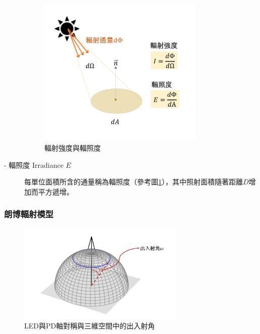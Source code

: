 \begin{description}
            \begin{figure}[htpb]
                \centering
                \includegraphics[width=8cm]{ch2pic/intensity_irradiance.png}
                \caption{輻射強度與輻照度}
                \label{pic:intensity_irradiance}
            \end{figure}

        \item[- 輻照度 Irradiance $E$] \hfill
            
            \qquad
            每單位面積所含的通量稱為輻照度（參考圖\ref{pic:intensity_irradiance}），其中照射面積隨著距離$D$增加而平方遞增。

            
            
    \end{description}


    



    
    \subsubsection{朗博輻射模型}
        \label{chp:lambertian}

        \begin{figure}[htpb]
            \centering
            \includegraphics[width=8cm]{ch2pic/3d_angle.png}
            \caption{LED與PD軸對稱與三維空間中的出入射角}
            \label{pic:angle_3d}
        \end{figure}
        

